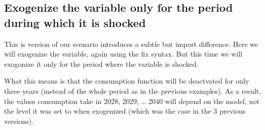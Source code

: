 \documentclass[letterpaper,10pt,english]{jupyterBook}
\begin{document}
\subsection{Exogenize the variable only for the period during which it is shocked}
\label{\detokenize{content/06_WBModels/LoadingWBModel:exogenize-the-variable-only-for-the-period-during-which-it-is-shocked}}
\sphinxAtStartPar
This is version of our scenario introduces a subtle but import difference.  Here we will exogenize the variable, again using the fix syntax. But this time we will exogonize it only for the period where the variable is shocked.

\sphinxAtStartPar
What this means is that the consumption function will be de\sphinxhyphen{}actvated for only three years (instead of the whole period as in the previous examples).  As a result, the values consumption take in 2028, 2029, … 2040 will depend on the model, not the level it was set to when exogenized (which was the case in the 3 previous versions).
\end{document}
